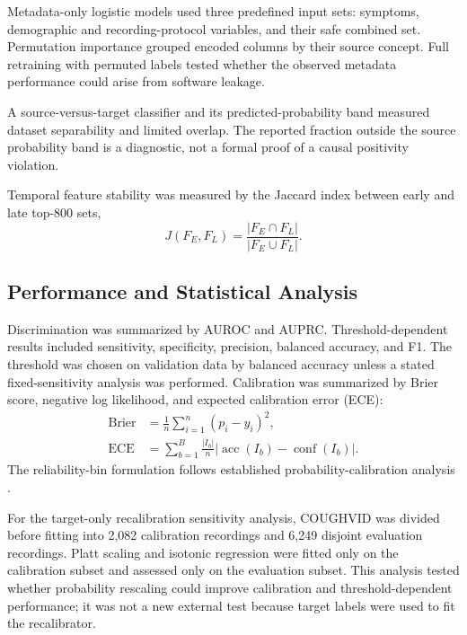 Metadata-only logistic models used three predefined input sets: symptoms,
demographic and recording-protocol variables, and their safe combined set.
Permutation importance grouped encoded columns by their source concept.
Full retraining with permuted labels tested whether the observed metadata
performance could arise from software leakage.

A source-versus-target classifier and its predicted-probability band measured
dataset separability and limited overlap. The reported fraction
outside the source probability band is a diagnostic, not a formal proof of a
causal positivity violation.

Temporal feature stability was measured by the Jaccard index between early and
late top-800 sets,
\begin{equation}
    J(F_E,F_L)=\frac{|F_E\cap F_L|}{|F_E\cup F_L|}.
\end{equation}

\subsection{Performance and Statistical Analysis}

Discrimination was summarized by AUROC and AUPRC. Threshold-dependent results
included sensitivity, specificity, precision, balanced accuracy, and F1. The
threshold was chosen on validation data by balanced accuracy unless a stated
fixed-sensitivity analysis was performed. Calibration was summarized by Brier
score, negative log likelihood, and expected calibration error (ECE):
\begin{align}
    \mathrm{Brier} &= \frac{1}{n}\sum_{i=1}^{n}(p_i-y_i)^2,\\
    \mathrm{ECE} &= \sum_{b=1}^{B}\frac{|I_b|}{n}
    \left|\operatorname{acc}(I_b)-\operatorname{conf}(I_b)\right|.
\end{align}
The reliability-bin formulation follows established probability-calibration
analysis \cite{niculescu2005calibration}.

For the target-only recalibration sensitivity analysis, COUGHVID was divided
before fitting into 2,082 calibration recordings and 6,249 disjoint evaluation
recordings. Platt scaling and isotonic regression were fitted only on the
calibration subset and assessed only on the evaluation subset. This analysis
tested whether probability rescaling could improve calibration and
threshold-dependent performance; it was not a new external test because target
labels were used to fit the recalibrator.

